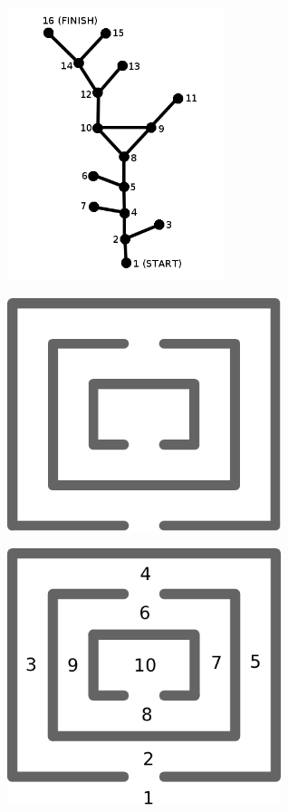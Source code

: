\documentclass{beamer} %
\begin{document}
\begin{frame}
  \centering
  \includegraphics[height=80mm]{assets/hampton3.png}
\end{frame}

\begin{frame}
  \centering
  \includegraphics[width=80mm]{assets/maze.pdf}
\end{frame}

\begin{frame}
  \centering
  \includegraphics[width=80mm]{assets/maze-b1-crop.pdf}
\end{frame}
\end{document}
